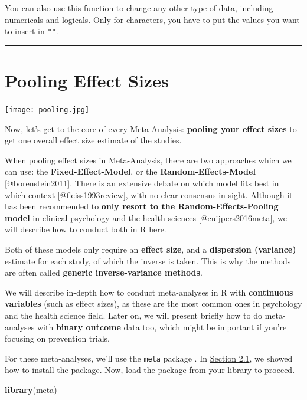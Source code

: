 \documentclass[]{book}
\newenvironment{Shaded}{\begin{snugshade}}{\end{snugshade}}
\newcommand{\KeywordTok}[1]{\textcolor[rgb]{0.13,0.29,0.53}{\textbf{#1}}}
\newcommand{\NormalTok}[1]{#1}
\begin{document}
You can also use this function to change any other type of data, including numericals and logicals. Only for characters, you have to put the values you want to insert in \texttt{""}.

\begin{center}\rule{0.5\linewidth}{\linethickness}\end{center}

\hypertarget{pool}{%
\chapter{Pooling Effect Sizes}\label{pool}}

\texttt{[image: pooling.jpg]}

Now, let's get to the core of every Meta-Analysis: \textbf{pooling your effect sizes} to get one overall effect size estimate of the studies.

\begin{rmdinfo}
When pooling effect sizes in Meta-Analysis, there are two approaches
which we can use: the \textbf{Fixed-Effect-Model}, or the
\textbf{Random-Effects-Model} {[}@borenstein2011{]}. There is an
extensive debate on which model fits best in which context
{[}@fleiss1993review{]}, with no clear consensus in sight. Although it
has been recommended to \textbf{only resort to the
Random-Effects-Pooling model} in clinical psychology and the health
sciences {[}@cuijpers2016meta{]}, we will describe how to conduct both
in R here.

Both of these models only require an \textbf{effect size}, and a
\textbf{dispersion (variance)} estimate for each study, of which the
inverse is taken. This is why the methods are often called
\textbf{generic inverse-variance methods}.
\end{rmdinfo}

We will describe in-depth how to conduct meta-analyses in R with \textbf{continuous variables} (such as effect sizes), as these are the most common ones in psychology and the health science field. Later on, we will present briefly how to do meta-analyses with \textbf{binary outcome} data too, which might be important if you're focusing on prevention trials.

For these meta-analyses, we'll use the \texttt{meta} package \citep{schwarzer2007meta}. In \protect\hyperlink{RStudio}{Section 2.1}, we showed how to install the package. Now, load the package from your library to proceed.

\begin{Shaded}
\begin{Highlighting}[]
\KeywordTok{library}\NormalTok{(meta)}
\end{Highlighting}
\end{Shaded}
\end{document}
